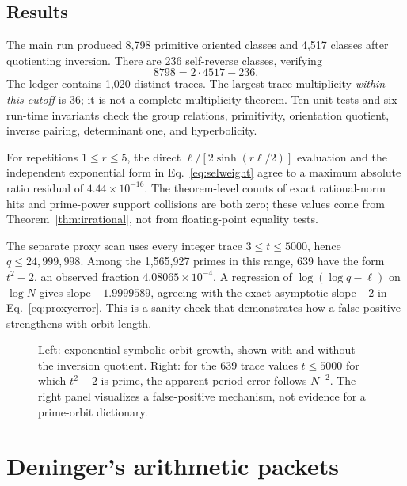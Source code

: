 \documentclass[11pt]{article}
\theoremstyle{definition}
\theoremstyle{remark}
\begin{document}
\subsection{Results}

The main run produced 8,798 primitive oriented classes and 4,517 classes after
quotienting inversion.  There are 236 self-reverse classes, verifying
\[
 8798=2\cdot4517-236.
\]
The ledger contains 1,020 distinct traces.  The largest trace multiplicity
\emph{within this cutoff} is 36; it is not a complete multiplicity theorem.
Ten unit tests and six run-time invariants check the group relations,
primitivity, orientation quotient, inverse pairing, determinant one, and
hyperbolicity.

For repetitions \(1\le r\le5\), the direct
\(\ell/[2\sinh(r\ell/2)]\) evaluation and the independent exponential form in
Eq.~\eqref{eq:selweight} agree to a maximum absolute ratio residual of
\(4.44\times10^{-16}\).  The theorem-level counts of exact rational-norm hits
and prime-power support collisions are both zero; these values come from
Theorem~\ref{thm:irrational}, not from floating-point equality tests.

The separate proxy scan uses every integer trace \(3\le t\le5000\), hence
\(q\le24{,}999{,}998\).  Among the 1,565,927 primes in this range, 639 have
the form \(t^2-2\), an observed fraction
\(4.08065\times10^{-4}\).  A regression of
\(\log(\log q-\ell)\) on \(\log N\) gives slope \(-1.9999589\), agreeing
with the exact asymptotic slope \(-2\) in Eq.~\eqref{eq:proxyerror}.  This is a
sanity check that demonstrates how a false positive strengthens with orbit
length.

\begin{figure}[ht]
\centering

\caption{Left: exponential symbolic-orbit growth, shown with and without the
inversion quotient.  Right: for the 639 trace values \(t\le5000\) for which
\(t^2-2\) is prime, the apparent period error follows \(N^{-2}\).  The right
panel visualizes a false-positive mechanism, not evidence for a prime-orbit
dictionary.}
\label{fig:experiment}
\end{figure}

\section{Deninger's arithmetic packets}
\label{sec:deninger}
\end{document}
